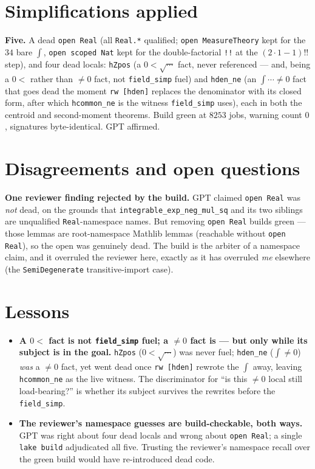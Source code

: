 \documentclass[11pt]{article}
\begin{document}
\section{Simplifications applied}
\textbf{Five.} A dead \texttt{open Real} (all \texttt{Real.*} qualified; \texttt{open MeasureTheory}
kept for the $34$ bare $\int$, \texttt{open scoped Nat} kept for the double-factorial \texttt{!!} at
the $(2\cdot1-1)\texttt{!!}$ step), and four dead locals: \texttt{hZpos} (a $0<\sqrt{\cdots}$ fact, never
referenced --- and, being a $0<$ rather than $\ne0$ fact, not \texttt{field\_simp} fuel) and
\texttt{hden\_ne} (an $\int\!\cdots\ne0$ fact that goes dead the moment \texttt{rw [hden]} replaces
the denominator with its closed form, after which \texttt{hcommon\_ne} is the witness
\texttt{field\_simp} uses), each in both the centroid and second-moment theorems. Build green at
$8253$ jobs, warning count $0$, signatures byte-identical. GPT affirmed.

\section{Disagreements and open questions}
\textbf{One reviewer finding rejected by the build.} GPT claimed \texttt{open Real} was \emph{not}
dead, on the grounds that \texttt{integrable\_exp\_neg\_mul\_sq} and its two siblings are
unqualified \texttt{Real}-namespace names. But removing \texttt{open Real} builds green --- those
lemmas are root-namespace Mathlib lemmas (reachable without \texttt{open Real}), so the open was
genuinely dead. The build is the arbiter of a namespace claim, and it overruled the reviewer here,
exactly as it has overruled \emph{me} elsewhere (the \texttt{SemiDegenerate} transitive-import case).

\section{Lessons}
\begin{itemize}[noitemsep]
  \item \textbf{A \texttt{$0<$} fact is not \texttt{field\_simp} fuel; a \texttt{$\ne0$} fact is ---
    but only while its subject is in the goal.} \texttt{hZpos} ($0<\sqrt{\cdots}$) was never fuel;
    \texttt{hden\_ne} ($\int\ne0$) \emph{was} a $\ne0$ fact, yet went dead once \texttt{rw [hden]}
    rewrote the $\int$ away, leaving \texttt{hcommon\_ne} as the live witness. The discriminator for
    ``is this $\ne0$ local still load-bearing?'' is whether its subject survives the rewrites before
    the \texttt{field\_simp}.
  \item \textbf{The reviewer's namespace guesses are build-checkable, both ways.} GPT was right about
    four dead locals and wrong about \texttt{open Real}; a single \texttt{lake build} adjudicated all
    five. Trusting the reviewer's namespace recall over the green build would have re-introduced dead
    code.
\end{itemize}
\end{document}
